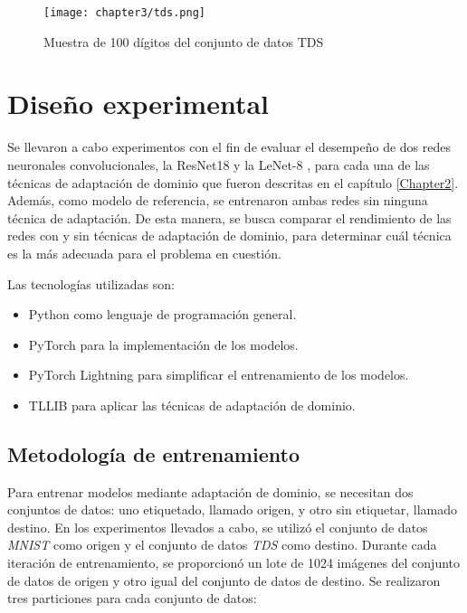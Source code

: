 \begin{figure}[H]
    \centering
    \texttt{[image: chapter3/tds.png]}
    \caption[Conjunto de datos TDS]{Muestra de 100 dígitos del conjunto de datos TDS}
    \label{fig:tds}
\end{figure}

\section{Diseño experimental}

Se llevaron a cabo experimentos con el fin de evaluar el desempeño de dos redes neuronales convolucionales, la ResNet18 \parencite{he2016deep} y la LeNet-8 \parencite{lecun1998gradient}, para cada una de las técnicas de adaptación de dominio que fueron descritas en el capítulo
\ref{Chapter2}. Además, como modelo de referencia, se entrenaron ambas redes sin ninguna técnica de adaptación. De esta
manera, se busca comparar el rendimiento de las redes con y sin técnicas de adaptación de dominio, para determinar cuál
técnica es la más adecuada para el problema en cuestión.

Las tecnologías utilizadas son:

\begin{itemize}
    \item Python como lenguaje de programación general.
    \item PyTorch \parencite{paszke2019pytorch} para la implementación de los modelos.
    \item PyTorch Lightning \parencite{falcon2019pytorch-lightning} para simplificar el entrenamiento de los modelos.
    \item TLLIB \parencite{tllib} para aplicar las técnicas de adaptación de dominio.
\end{itemize}

\subsection{Metodología de entrenamiento}

Para entrenar modelos mediante adaptación de dominio, se necesitan dos conjuntos de datos: uno etiquetado, llamado
origen, y otro sin etiquetar, llamado destino. En los experimentos llevados a cabo, se utilizó el conjunto de datos
    {\it MNIST} como origen y el conjunto de datos {\it TDS} como destino. Durante cada iteración de entrenamiento, se
proporcionó un lote de 1024 imágenes del conjunto de datos de origen y otro igual del conjunto de datos de destino. Se
realizaron tres particiones para cada conjunto de datos:

